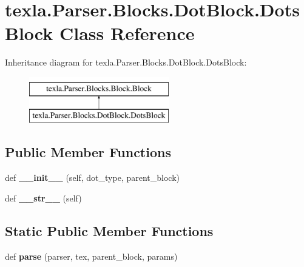 \hypertarget{classtexla_1_1Parser_1_1Blocks_1_1DotBlock_1_1DotsBlock}{}\section{texla.\+Parser.\+Blocks.\+Dot\+Block.\+Dots\+Block Class Reference}
\label{classtexla_1_1Parser_1_1Blocks_1_1DotBlock_1_1DotsBlock}
Inheritance diagram for texla.\+Parser.\+Blocks.\+Dot\+Block.\+Dots\+Block\+:\begin{figure}[H]
\begin{center}
\leavevmode
\includegraphics[height=2.000000cm]{classtexla_1_1Parser_1_1Blocks_1_1DotBlock_1_1DotsBlock}
\end{center}
\end{figure}
\subsection*{Public Member Functions}
\begin{DoxyCompactItemize}
\item 
\hypertarget{classtexla_1_1Parser_1_1Blocks_1_1DotBlock_1_1DotsBlock_aa9b718c90f1b7e2fe739af312bac9f41}{}\label{classtexla_1_1Parser_1_1Blocks_1_1DotBlock_1_1DotsBlock_aa9b718c90f1b7e2fe739af312bac9f41} 
def {\bfseries \+\_\+\+\_\+init\+\_\+\+\_\+} (self, dot\+\_\+type, parent\+\_\+block)
\item 
\hypertarget{classtexla_1_1Parser_1_1Blocks_1_1DotBlock_1_1DotsBlock_a55e745da687b817be13f2d467705f990}{}\label{classtexla_1_1Parser_1_1Blocks_1_1DotBlock_1_1DotsBlock_a55e745da687b817be13f2d467705f990} 
def {\bfseries \+\_\+\+\_\+str\+\_\+\+\_\+} (self)
\end{DoxyCompactItemize}
\subsection*{Static Public Member Functions}
\begin{DoxyCompactItemize}
\item 
\hypertarget{classtexla_1_1Parser_1_1Blocks_1_1DotBlock_1_1DotsBlock_a6a25a42bf852862b9861994a3347513f}{}\label{classtexla_1_1Parser_1_1Blocks_1_1DotBlock_1_1DotsBlock_a6a25a42bf852862b9861994a3347513f} 
def {\bfseries parse} (parser, tex, parent\+\_\+block, params)
\end{DoxyCompactItemize}
